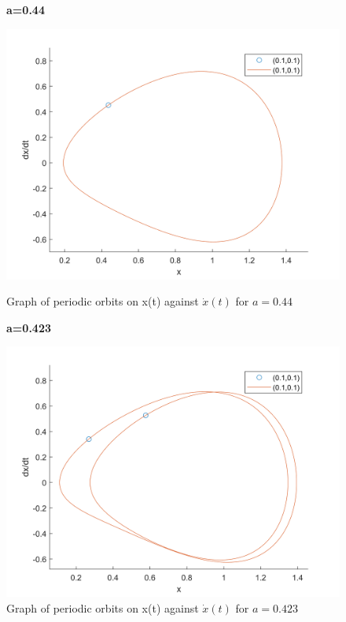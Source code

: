 \documentclass[10pt]{article}
\begin{document}
\begin{figure}[H]
    \begin{minipage}[b]{0.5\linewidth}
            \centering
            \textbf{a=0.44}\par
            \includegraphics[width=\textwidth]{Files/q5,a=0.44.png}
            \caption{Graph of periodic orbits on x(t) against $\dot{x}(t)$ for $a=0.44$}
        \end{minipage}
        \hfill
        \begin{minipage}[b]{0.5\linewidth}
            \centering
            \textbf{a=0.423}\par
            \includegraphics[width=\textwidth]{Files/q5,a=0.423.png}
            \caption{Graph of periodic orbits on x(t) against $\dot{x}(t)$ for $a=0.423$}
        \end{minipage}
\end{figure}
\end{document}
